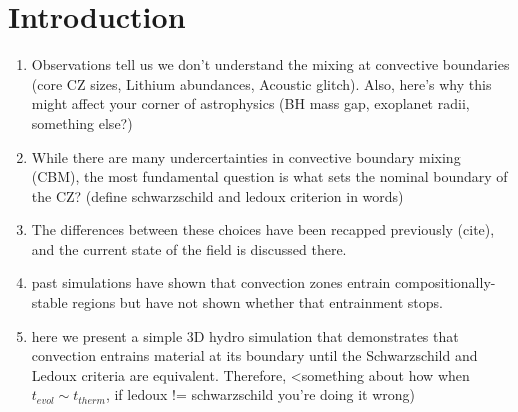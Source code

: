 
\section{Introduction}
\label{sec:introduction}

\begin{enumerate}
    \item Observations tell us we don't understand the mixing at convective boundaries (core CZ sizes, Lithium abundances, Acoustic glitch). Also, here's why this might affect your corner of astrophysics (BH mass gap, exoplanet radii, something else?)
    \item While there are many undercertainties in convective boundary mixing (CBM), the most fundamental question is what sets the nominal boundary of the CZ? (define schwarzschild and ledoux criterion in words)
    \item The differences between these choices have been recapped previously (cite), and the current state of the field is discussed there.
    \item past simulations have shown that convection zones entrain compositionally-stable regions but have not shown whether that entrainment stops.
    \item here we present a simple 3D hydro simulation that demonstrates that convection entrains material at its boundary until the Schwarzschild and Ledoux criteria are equivalent. Therefore, <something about how when $t_{evol} \sim t_{therm}$, if ledoux != schwarzschild you're doing it wrong)
\end{enumerate}

